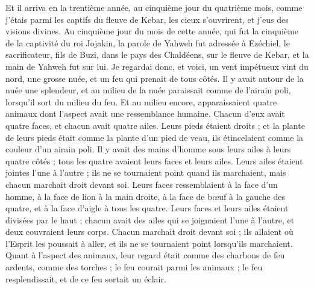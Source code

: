 \BFont
\begin{multicols}{2}
\VerseOne{}Et il arriva en la trentième année, au cinquième jour du quatrième mois, comme j'étais parmi les captifs du fleuve de Kebar, les cieux s’ouvrirent, et j’eus des visions divines.
Au cinquième jour du mois de cette année, qui fut la cinquième de la captivité du roi Jojakin,
la parole de Yahweh fut adressée à Ezéchiel, le sacrificateur, fils de Buzi, dans le pays des Chaldéens, sur le fleuve de Kebar, et la main de Yahweh fut sur lui.
Je regardai donc, et voici, un vent impétueux vint du nord, une grosse nuée, et un feu qui prenait de tous côtés. Il y avait autour de la nuée une splendeur, et au milieu de la nuée paraissait comme de l’airain poli, lorsqu’il sort du milieu du feu.
Et au milieu encore, apparaissaient quatre animaux dont l’aspect avait une ressemblance humaine.
Chacun d'eux avait quatre faces, et chacun avait quatre ailes.
Leurs pieds étaient droits ; et la plante de leurs pieds était comme la plante d'un pied de veau, ils étincelaient comme la couleur d'un airain poli.
Il y avait des mains d'homme sous leurs ailes à leurs quatre côtés ; tous les quatre avaient leurs faces et leurs ailes.
Leurs ailes étaient jointes l'une à l'autre ; ils ne se tournaient point quand ils marchaient, mais chacun marchait droit devant soi.
Leurs faces ressemblaient à la face d'un homme, à la face de lion à la main droite, à la face de bœuf à la gauche des quatre, et à la face d'aigle à tous les quatre.
Leurs faces et leurs ailes étaient divisées par le haut ; chacun avait des ailes qui se joignaient l'une à l'autre, et deux couvraient leurs corps.
Chacun marchait droit devant soi ; ils allaient où l’Esprit les poussait à aller, et ils ne se tournaient point lorsqu'ils marchaient.
Quant à l’aspect des animaux, leur regard était comme des charbons de feu ardents, comme des torches ; le feu courait parmi les animaux ; le feu resplendissait, et de ce feu sortait un éclair.

\end{multicols}
